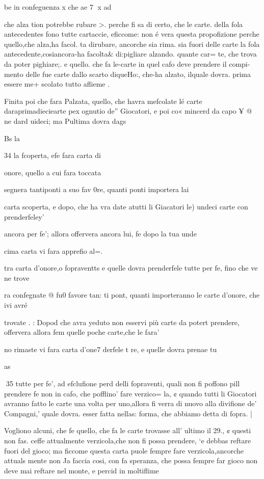 \documentclass[11pt,a6paper]{article}
\begin{document}
be in confeguenza x che ae 7
x ad

che alza tion potrebbe rubare >.
perche fi sa di certo, che le
carte. della fola antecedentes
fono tutte cartaccie, eficcome:
non é vera questa propofizione
perche quello,che alza,ha facol.
ta dirubare, ancorche sia rima.
sia fuori delle carte la fola antecedente,cosiancora-ha facolta&
di:pigliare alzando. quante car=
te, che trova da poter pighiare;.
e quello. che fa le-carte in quel
cafo deve prendere il compi-mento delle fue carte dallo scarto diqueHo:, che-ha alzato, ilquale dovra. prima essere me+
scolato tutto aflieme .

Finita poi che fara Palzata,
quello, che havra mefcolate lé
carte daraprimadieciearte pex
ognutio de” Giocatori, e poi co«
mincerd da capo ¥ @ ne dard
uideci; ma Pultima dovra dags

Bs la

 
 

34
la fcoperta, efe fara carta di

onore, quello a cui fara toccata

segnera tantiponti a suo fav 0re, quanti ponti importera lai

carta scoperta, e dopo, che ha
vra date atutti li Giacatori le)
undeci carte con prenderfeley’

ancora per fe’; allora offervera
ancora lui, fe dopo la tua unde

cima carta vi fara apprefio al=.

tra carta d’onore,o fopraventts
e quelle dovra prenderfele tutte per fe, fino che ve ne trove

ra confegnate @ fu0 favore tan:
ti pont, quanti importeranno
le carte d’onore, che ivi avré

trovate . :
Dopod che avra yeduto non
esservi più carte da potert
prendere, offervera allora fem
quelle poche carte,che le fara’

no rimaste vi fara carta d’one7
derfele
t
re, e quelle dovra prenae
tu

as

 
35
tutte per fe’, ad efclufione perd
delli fopraventi, quali non fi
poffono pill prendere fe non in
cafo, che pofflino’ fare verzico=
la, ¢ quando tutti li Giocatori
avranno fatto le carte una volta per uno,allora fi verra di nuovo alla divifione de’ Compagni,'
quale dovra. esser fatta nellas:
forma, che abbiamo detta di
fopra. |

Vogliono alcuni, che fe quello, che fa le carte trovasse all’
ultimo il 29., ¢ questi non fas.
ceffe attualmente verzicola,che
non fi possa prendere, ‘e debbas
reftare fuori del gioco; ma ficcome questa carta puole fempre
fare verzicola,ancorche attuals
mente non Ja faccia cosi, con fa
speranza, che possa fempre far
gioco non deve mai reftare nel
monte, e percid in moltiflime
\end{document}
